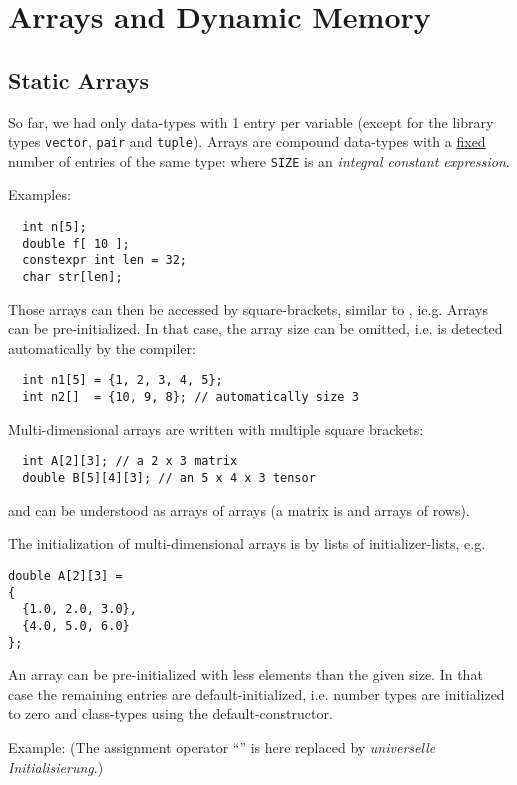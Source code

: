 \section{Arrays and Dynamic Memory}
\subsection{Static Arrays}
So far, we had only data-types with 1 entry per variable (except for the library types \texttt{vector}, \texttt{pair} and \texttt{tuple}).
Arrays are compound data-types with a \underline{fixed} number of entries of the same type:
%
%
where \texttt{SIZE} is an \emph{integral constant expression}.

Examples:
\begin{verbatim}
  int n[5];
  double f[ 10 ];
  constexpr int len = 32;
  char str[len];
\end{verbatim}
%
Those arrays can then be accessed by square-brackets, similar to , ie.g.
%
%
Arrays can be pre-initialized. In that case, the array size can be omitted, i.e. is detected
automatically by the compiler:
\begin{verbatim}
  int n1[5] = {1, 2, 3, 4, 5};
  int n2[]  = {10, 9, 8}; // automatically size 3
\end{verbatim}

Multi-dimensional arrays are written with multiple square brackets:
%
\begin{verbatim}
  int A[2][3]; // a 2 x 3 matrix
  double B[5][4][3]; // an 5 x 4 x 3 tensor
\end{verbatim}
%
and can be understood as arrays of arrays (a matrix is and arrays of rows).

The initialization of multi-dimensional arrays is by lists of initializer-lists, e.g.
%
\begin{verbatim}
double A[2][3] =
{
  {1.0, 2.0, 3.0},
  {4.0, 5.0, 6.0}
};
\end{verbatim}

\begin{rem}
  An array can be pre-initialized with less elements than the given size. In that case the remaining entries are default-initialized, i.e.
  number types are initialized to zero and class-types using the default-constructor.

  Example:
  (The assignment operator ``\cpp{=}'' is here replaced by \textit{universelle Initialisierung}.)
\end{rem}

